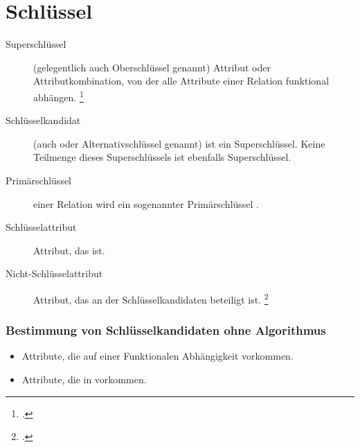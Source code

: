 \documentclass{lehramt-informatik-haupt}
\begin{document}
\let\ah=\liAttributHuelle
\let\m=\liAttributMenge

%

\chapter{Schlüssel}

\begin{description}
\item[Superschlüssel]

(gelegentlich auch Oberschlüssel genannt) Attribut
oder Attributkombination, von der alle Attribute einer Relation
funktional abhängen.
\footcite[Seite 181 Kapitel 6.2 „Superschlüssel“]{kemper}

\item[Schlüsselkandidat]

(auch  oder Alternativschlüssel genannt) ist
ein  Superschlüssel. Keine Teilmenge dieses
Superschlüssels ist ebenfalls Superschlüssel.

\item[Primärschlüssel]

 einer Relation wird ein
sogenannter Primärschlüssel .

\item[Schlüsselattribut]

Attribut, das  ist.

\item[Nicht-Schlüsselattribut]

Attribut, das an  der Schlüsselkandidaten beteiligt ist.
\footcite[Seite 7]{db:fs:4}
\end{description}

%

\subsection{Bestimmung von Schlüsselkandidaten ohne Algorithmus}

\begin{itemize}
\item Attribute, die auf  einer
Funktionalen Abhängigkeit vorkommen.

\item Attribute, die in 
vorkommen.
\end{itemize}
\end{document}
